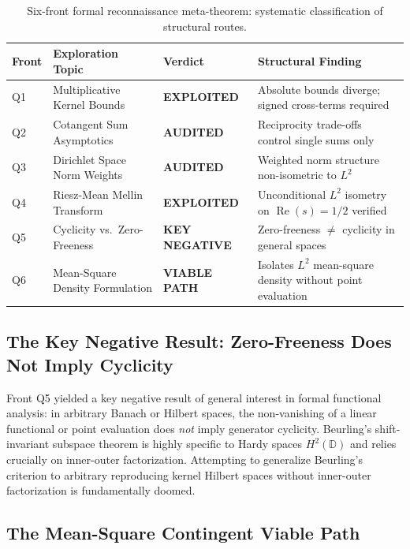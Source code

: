 \documentclass[11pt,a4paper]{article}
\theoremstyle{definition}
\theoremstyle{remark}
\DeclareMathOperator{\RePart}{Re}
\renewcommand{\Re}{\RePart}
\begin{document}
\begin{table}[htbp]
\centering
\small
\begin{tabular}{llll}
\toprule
\textbf{Front} & \textbf{Exploration Topic} & \textbf{Verdict} & \textbf{Structural Finding} \\
\midrule
Q1 & Multiplicative Kernel Bounds & \textbf{EXPLOITED} & Absolute bounds diverge; signed cross-terms required \\
Q2 & Cotangent Sum Asymptotics & \textbf{AUDITED} & Reciprocity trade-offs control single sums only \\
Q3 & Dirichlet Space Norm Weights & \textbf{AUDITED} & Weighted norm structure non-isometric to $L^2$ \\
Q4 & Riesz-Mean Mellin Transform & \textbf{EXPLOITED} & Unconditional $L^2$ isometry on $\Re(s)=1/2$ verified \\
Q5 & Cyclicity vs.\ Zero-Freeness & \textbf{KEY NEGATIVE} & Zero-freeness $\ne$ cyclicity in general spaces \cite{Garcia2016} \\
Q6 & Mean-Square Density Formulation & \textbf{VIABLE PATH} & Isolates $L^2$ mean-square density without point evaluation \\
\bottomrule
\end{tabular}
\caption{Six-front formal reconnaissance meta-theorem: systematic classification of structural routes.}
\label{tab:reconnaissance_audit}
\end{table}

\subsection{The Key Negative Result: Zero-Freeness Does Not Imply Cyclicity}

Front Q5 yielded a key negative result of general interest in formal functional analysis: in arbitrary Banach or Hilbert spaces, the non-vanishing of a linear functional or point evaluation does \emph{not} imply generator cyclicity. Beurling's shift-invariant subspace theorem is highly specific to Hardy spaces $H^2(\mathbb{D})$ and relies crucially on inner-outer factorization. Attempting to generalize Beurling's criterion to arbitrary reproducing kernel Hilbert spaces without inner-outer factorization is fundamentally doomed.

\subsection{The Mean-Square Contingent Viable Path}
\end{document}
